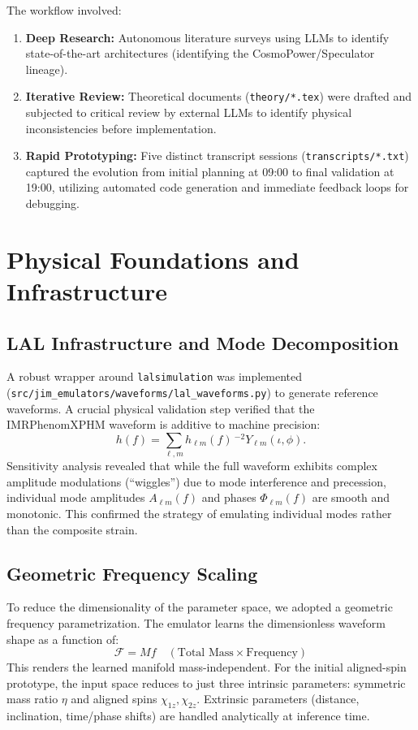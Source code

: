 \documentclass[11pt,a4paper]{article}
\begin{document}
\noindent The workflow involved:
\begin{enumerate}
    \item \textbf{Deep Research:} Autonomous literature surveys using LLMs to identify state-of-the-art architectures (identifying the CosmoPower/Speculator lineage).
    \item \textbf{Iterative Review:} Theoretical documents (\texttt{theory/*.tex}) were drafted and subjected to critical review by external LLMs to identify physical inconsistencies before implementation.
    \item \textbf{Rapid Prototyping:} Five distinct transcript sessions (\texttt{transcripts/*.txt}) captured the evolution from initial planning at 09:00 to final validation at 19:00, utilizing automated code generation and immediate feedback loops for debugging.
\end{enumerate}

\section{Physical Foundations and Infrastructure}

\subsection{LAL Infrastructure and Mode Decomposition}
A robust wrapper around \texttt{lalsimulation} was implemented (\texttt{src/jim\_emulators/waveforms/lal\_waveforms.py}) to generate reference waveforms. A crucial physical validation step verified that the IMRPhenomXPHM waveform is additive to machine precision:
\begin{equation}
    h(f) = \sum_{\ell, m} h_{\ell m}(f) \, {}^{-2}Y_{\ell m}(\iota, \phi).
\end{equation}
Sensitivity analysis revealed that while the full waveform exhibits complex amplitude modulations (``wiggles'') due to mode interference and precession, individual mode amplitudes $A_{\ell m}(f)$ and phases $\Phi_{\ell m}(f)$ are smooth and monotonic. This confirmed the strategy of emulating individual modes rather than the composite strain.

\subsection{Geometric Frequency Scaling}
To reduce the dimensionality of the parameter space, we adopted a geometric frequency parametrization. The emulator learns the dimensionless waveform shape as a function of:
\begin{equation}
    \mathcal{F} = M f \quad (\text{Total Mass} \times \text{Frequency})
\end{equation}
This renders the learned manifold mass-independent. For the initial aligned-spin prototype, the input space reduces to just three intrinsic parameters: symmetric mass ratio $\eta$ and aligned spins $\chi_{1z}, \chi_{2z}$. Extrinsic parameters (distance, inclination, time/phase shifts) are handled analytically at inference time.
\end{document}
